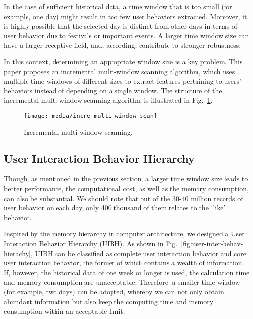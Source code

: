 \documentclass{article}
\begin{document}
In the case of sufficient historical data, a time window that is too small (for example, one day) might result in too few user behaviors extracted. Moreover, it is highly possible that the selected day is distinct from other days in terms of user behavior due to festivals or important events. A larger time window size can have a larger receptive field, and, according, contribute to stronger robustness.

In this context, determining an appropriate window size is a key problem. This paper proposes an incremental multi-window scanning algorithm, which uses multiple time windows of different sizes to extract features pertaining to users’ behaviors instead of depending on a single window. The structure of the incremental multi-window scanning algorithm is illustrated in Fig.~\ref{fig:incre-multi-window-scan}.

\begin{figure}
  \centering
  \texttt{[image: media/incre-multi-window-scan]}
  \caption{Incremental multi-window scanning.}
  \label{fig:incre-multi-window-scan}
\end{figure}

\subsection{User Interaction Behavior Hierarchy}
\label{sec:user-interaction-behavior-hierarchy}

Though, as mentioned in the previous section, a larger time window size leads to better performance, the computational cost, as well as the memory consumption, can also be substantial. We should note that out of the 30-40 million records of user behavior on each day, only 400 thousand of them relates to the ‘like’ behavior.

Inspired by the memory hierarchy in computer architecture, we designed a User Interaction Behavior Hierarchy (UIBH).
As shown in Fig.~\ref{fig:user-inter-behav-hierachy}, UIBH can be classified as complete user interaction behavior and core user interaction behavior, the former of which contains a wealth of information.
If, however, the historical data of one week or longer is used, the calculation time and memory consumption are unacceptable.
Therefore, a smaller time window (for example, two days) can be adopted, whereby we can not only obtain abundant information but also keep the computing time and memory consumption within an acceptable limit.
\end{document}
